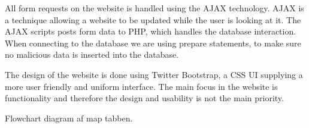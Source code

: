 All form requests on the website is handled using the AJAX technology\citep{ajax}. AJAX is a technique allowing a website to be updated while the user is looking at it.
The AJAX scripts posts form data to PHP, which handles the database interaction. When connecting to the database we are using prepare statements, to make sure no malicious data is inserted into the database.


The design of the website is done using Twitter Bootstrap\citep{twitterbootstrap}, a CSS UI supplying a more user friendly and uniform interface.
The main focus in the website is functionality and therefore the design and usability is not the main priority.



Flowchart diagram af map tabben.